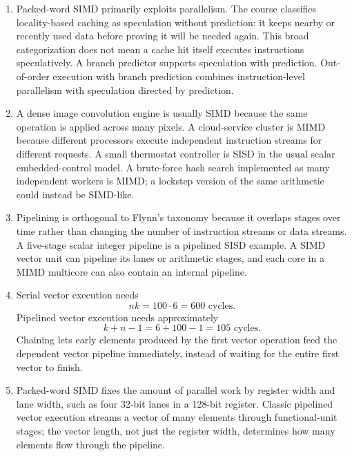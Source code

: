 \documentclass[11pt]{article}
\begin{document}
\begin{enumerate}
    \item Packed-word SIMD primarily exploits parallelism.
    The course classifies locality-based caching as speculation without prediction: it keeps nearby or recently used data before proving it will be needed again.
    This broad categorization does not mean a cache hit itself executes instructions speculatively.
    A branch predictor supports speculation with prediction.
    Out-of-order execution with branch prediction combines instruction-level parallelism with speculation directed by prediction.

    \item A dense image convolution engine is usually SIMD because the same operation is applied across many pixels.
    A cloud-service cluster is MIMD because different processors execute independent instruction streams for different requests.
    A small thermostat controller is SISD in the usual scalar embedded-control model.
    A brute-force hash search implemented as many independent workers is MIMD; a lockstep version of the same arithmetic could instead be SIMD-like.

    \item Pipelining is orthogonal to Flynn's taxonomy because it overlaps stages over time rather than changing the number of instruction streams or data streams.
    A five-stage scalar integer pipeline is a pipelined SISD example.
    A SIMD vector unit can pipeline its lanes or arithmetic stages, and each core in a MIMD multicore can also contain an internal pipeline.

    \item Serial vector execution needs
    \[
        nk = 100\cdot 6 = 600\text{ cycles}.
    \]
    Pipelined vector execution needs approximately
    \[
        k+n-1 = 6+100-1 = 105\text{ cycles}.
    \]
    Chaining lets early elements produced by the first vector operation feed the dependent vector pipeline immediately, instead of waiting for the entire first vector to finish.

    \item Packed-word SIMD fixes the amount of parallel work by register width and lane width, such as four 32-bit lanes in a 128-bit register.
    Classic pipelined vector execution streams a vector of many elements through functional-unit stages; the vector length, not just the register width, determines how many elements flow through the pipeline.
\end{enumerate}
\end{document}
